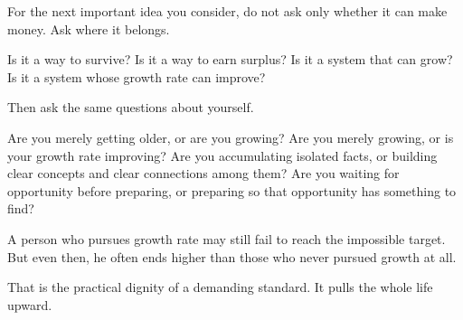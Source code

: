 For the next important idea you consider, do not ask only whether it can make money. Ask where it belongs.

Is it a way to survive? Is it a way to earn surplus? Is it a system that can grow? Is it a system whose growth rate can improve?

Then ask the same questions about yourself.

Are you merely getting older, or are you growing? Are you merely growing, or is your growth rate improving? Are you accumulating isolated facts, or building clear concepts and clear connections among them? Are you waiting for opportunity before preparing, or preparing so that opportunity has something to find?

A person who pursues growth rate may still fail to reach the impossible target. But even then, he often ends higher than those who never pursued growth at all.

That is the practical dignity of a demanding standard. It pulls the whole life upward.

